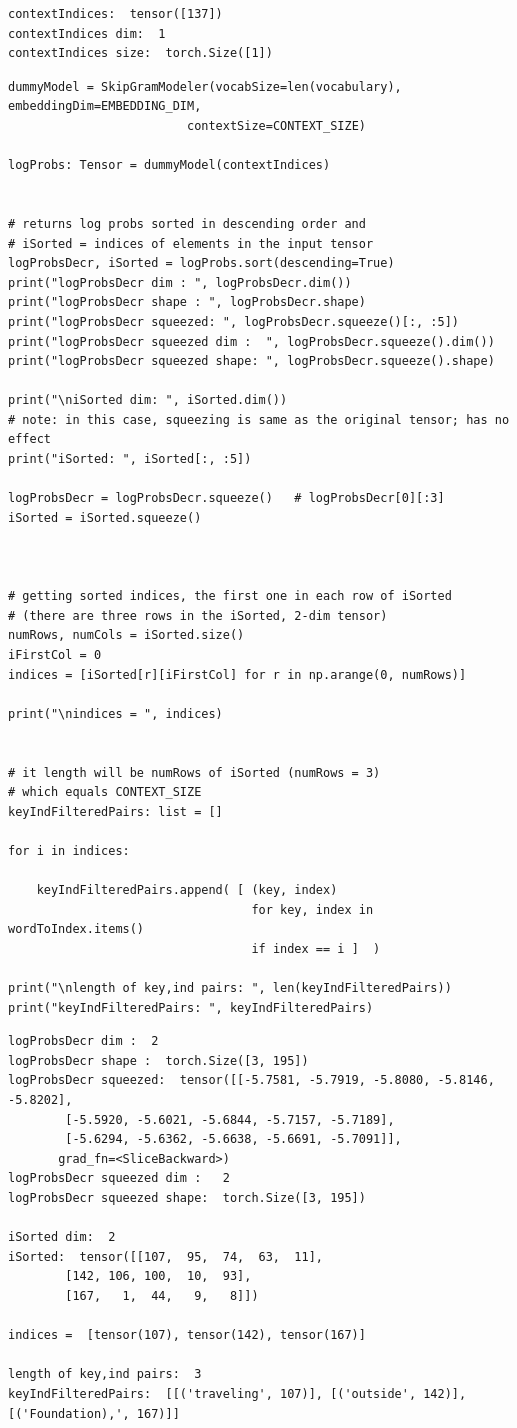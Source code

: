 \documentclass[
]{article}
\begin{document}
\begin{verbatim}
contextIndices:  tensor([137])
contextIndices dim:  1
contextIndices size:  torch.Size([1])
\end{verbatim}

\begin{verbatim}
dummyModel = SkipGramModeler(vocabSize=len(vocabulary), embeddingDim=EMBEDDING_DIM,
                         contextSize=CONTEXT_SIZE)

logProbs: Tensor = dummyModel(contextIndices)


# returns log probs sorted in descending order and
# iSorted = indices of elements in the input tensor
logProbsDecr, iSorted = logProbs.sort(descending=True)
print("logProbsDecr dim : ", logProbsDecr.dim())
print("logProbsDecr shape : ", logProbsDecr.shape)
print("logProbsDecr squeezed: ", logProbsDecr.squeeze()[:, :5])
print("logProbsDecr squeezed dim :  ", logProbsDecr.squeeze().dim())
print("logProbsDecr squeezed shape: ", logProbsDecr.squeeze().shape)

print("\niSorted dim: ", iSorted.dim())
# note: in this case, squeezing is same as the original tensor; has no effect
print("iSorted: ", iSorted[:, :5])

logProbsDecr = logProbsDecr.squeeze()   # logProbsDecr[0][:3]
iSorted = iSorted.squeeze()



# getting sorted indices, the first one in each row of iSorted
# (there are three rows in the iSorted, 2-dim tensor)
numRows, numCols = iSorted.size()
iFirstCol = 0
indices = [iSorted[r][iFirstCol] for r in np.arange(0, numRows)]

print("\nindices = ", indices)


# it length will be numRows of iSorted (numRows = 3)
# which equals CONTEXT_SIZE
keyIndFilteredPairs: list = []

for i in indices:

    keyIndFilteredPairs.append( [ (key, index)
                                  for key, index in wordToIndex.items()
                                  if index == i ]  )

print("\nlength of key,ind pairs: ", len(keyIndFilteredPairs))
print("keyIndFilteredPairs: ", keyIndFilteredPairs)
\end{verbatim}

\begin{verbatim}
logProbsDecr dim :  2
logProbsDecr shape :  torch.Size([3, 195])
logProbsDecr squeezed:  tensor([[-5.7581, -5.7919, -5.8080, -5.8146, -5.8202],
        [-5.5920, -5.6021, -5.6844, -5.7157, -5.7189],
        [-5.6294, -5.6362, -5.6638, -5.6691, -5.7091]],
       grad_fn=<SliceBackward>)
logProbsDecr squeezed dim :   2
logProbsDecr squeezed shape:  torch.Size([3, 195])

iSorted dim:  2
iSorted:  tensor([[107,  95,  74,  63,  11],
        [142, 106, 100,  10,  93],
        [167,   1,  44,   9,   8]])

indices =  [tensor(107), tensor(142), tensor(167)]

length of key,ind pairs:  3
keyIndFilteredPairs:  [[('traveling', 107)], [('outside', 142)], [('Foundation),', 167)]]
\end{verbatim}
\end{document}
